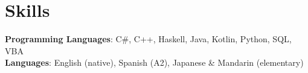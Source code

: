 \section{Skills}
\begin{itemize}[leftmargin=0.15in, label={}]
\small{\item{
    \textbf{Programming Languages}{: C\#, C++, Haskell, Java, Kotlin, Python, SQL, VBA} \\
    \textbf{Languages}{: English (native), Spanish (A2), Japanese \& Mandarin (elementary)} \\
}}
\end{itemize}
